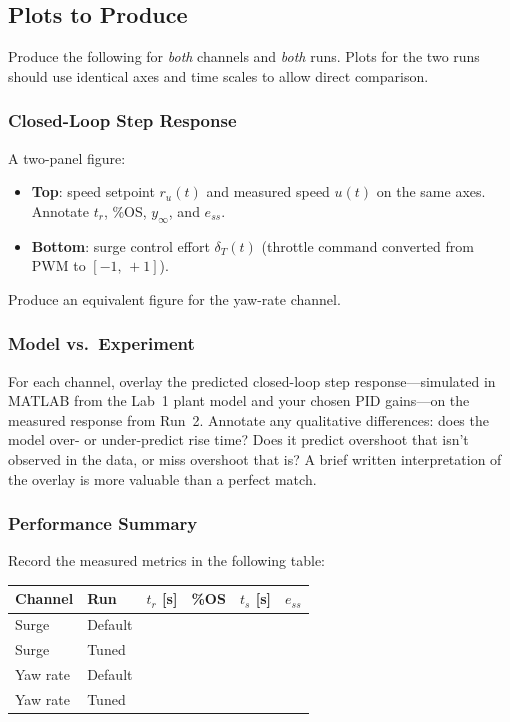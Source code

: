 \documentclass[../../book.tex]{subfiles}
\begin{document}
\subsection{Plots to Produce}

Produce the following for \emph{both} channels and \emph{both} runs.  Plots for the two runs should use identical axes and time scales to allow direct comparison.

\subsubsection{Closed-Loop Step Response}

A two-panel figure:
\begin{itemize}
  \item \textbf{Top}: speed setpoint $r_u(t)$ and measured speed $u(t)$ on the same axes.  Annotate $t_r$, \%OS, $y_\infty$, and $e_{ss}$.
  \item \textbf{Bottom}: surge control effort $\delta_T(t)$ (throttle command converted from PWM to $[-1,\,+1]$).
\end{itemize}
Produce an equivalent figure for the yaw-rate channel.

\subsubsection{Model vs.\ Experiment}

For each channel, overlay the predicted closed-loop step response---simulated in MATLAB from the Lab~1 plant model and your chosen PID gains---on the measured response from Run~2.  Annotate any qualitative differences: does the model over- or under-predict rise time?  Does it predict overshoot that isn't observed in the data, or miss overshoot that is?  A brief written interpretation of the overlay is more valuable than a perfect match.

\subsubsection{Performance Summary}

Record the measured metrics in the following table:

\vspace{6pt}
\begin{center}
\begin{tabular}{C{1.8cm} C{1.8cm} C{1.8cm} C{1.8cm} C{1.8cm} C{1.8cm}}
  \textbf{Channel} & \textbf{Run} & \textbf{$t_r$ [s]} & \textbf{\%OS} & \textbf{$t_s$ [s]} & \textbf{$e_{ss}$} \\
  \midrule
  Surge    & Default & & & & \\[6pt]
  Surge    & Tuned   & & & & \\[6pt]
  Yaw rate & Default & & & & \\[6pt]
  Yaw rate & Tuned   & & & & \\[6pt]
  \bottomrule
\end{tabular}
\end{center}
\vspace{6pt}
\end{document}
